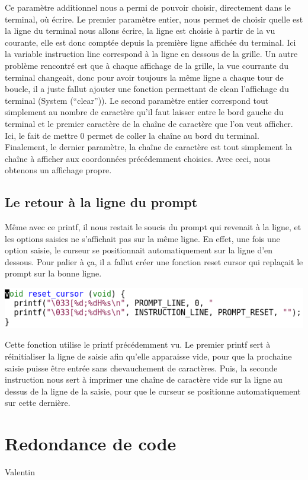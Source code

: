 \documentclass{article}
\begin{document}
Ce paramètre additionnel nous a permi de pouvoir choisir, directement dans le terminal, où écrire. Le premier paramètre entier, nous permet de choisir quelle est la ligne du terminal nous allons écrire, la ligne est choisie à partir de la vu courante, elle est donc comptée depuis la première ligne affichée du terminal. Ici la variable instruction line correspond à la ligne en dessous de la grille. Un autre problème rencontré est que à chaque affichage de la grille, la vue courrante du terminal changeait, donc pour avoir toujours la même ligne a chaque tour de boucle, il a juste fallut ajouter une fonction permettant de clean l'affichage du terminal (System (``clear'')).
Le second paramètre entier correspond tout simplement au nombre de caractère qu'il faut laisser entre le bord gauche du terminal et le premier caractère de la chaîne de caractère que l'on veut afficher. Ici, le fait de mettre 0 permet de coller la chaîne au bord du terminal.
Finalement, le dernier paramètre, la chaîne de caractère est tout simplement la chaîne à afficher aux coordonnées précédemment choisies. Avec ceci, nous obtenons un affichage propre.

\newpage

\subsection {Le retour à la ligne du prompt}
Même avec ce printf, il nous restait le soucis du prompt qui revenait à la ligne, et les options saisies ne s'affichait pas sur la même ligne. En effet, une fois une option saisie, le curseur se positionnait automatiquement sur la ligne d'en dessous. Pour palier à ça, il a fallut créer une fonction reset cursor qui replaçait le prompt sur la bonne ligne.

\begin{flushleft}
\includegraphics[scale=0.45]{reset_cursor.png}
\end{flushleft}

Cette fonction utilise le printf précédemment vu. Le premier printf sert à réinitialiser la ligne de saisie afin qu'elle apparaisse vide, pour que la prochaine saisie puisse être entrée sans chevauchement de caractères. Puis, la seconde instruction nous sert à imprimer une chaîne de caractère vide sur la ligne au dessus de la ligne de la saisie, pour que le curseur se positionne automatiquement sur cette dernière.

\section {Redondance de code}
Valentin
\end{document}

